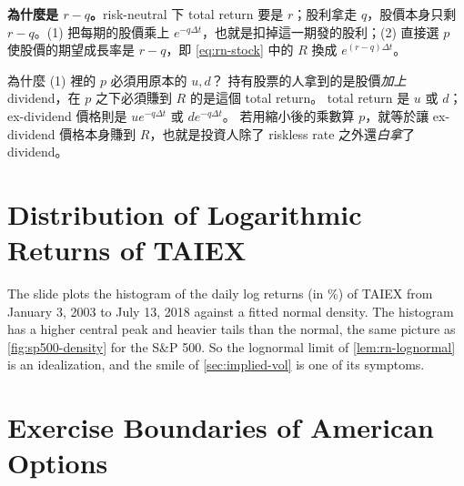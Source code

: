 \begin{remark}
	\textbf{為什麼是 $r-q$。}risk-neutral 下 total return 要是 $r$；股利拿走 $q$，股價本身只剩 $r-q$。(1) 把每期的股價乘上 $e^{-q\Delta t}$，也就是扣掉這一期發的股利；(2) 直接選 $p$ 使股價的期望成長率是 $r-q$，即 \eqref{eq:rn-stock} 中的 $R$ 換成 $e^{(r-q)\Delta t}$。
\end{remark}

\begin{note}
	為什麼 (1) 裡的 $p$ 必須用原本的 $u,d$？
	持有股票的人拿到的是股價\emph{加上} dividend，在 $p$ 之下必須賺到 $R$ 的是這個 total return。
	total return 是 $u$ 或 $d$；ex-dividend 價格則是 $ue^{-q\Delta t}$ 或 $de^{-q\Delta t}$。
	若用縮小後的乘數算 $p$，就等於讓 ex-dividend 價格本身賺到 $R$，也就是投資人除了 riskless rate 之外還\emph{白拿}了 dividend。
\end{note}
\suppend

\section{Distribution of Logarithmic Returns of TAIEX}


The slide plots the histogram of the daily log returns (in \%) of TAIEX from January 3, 2003 to July 13, 2018 against a fitted normal density.
\suppstart
The histogram has a higher central peak and heavier tails than the normal, the same picture as \autoref{fig:sp500-density} for the S\&P 500.
So the lognormal limit of \autoref{lem:rn-lognormal} is an idealization, and the smile of \autoref{sec:implied-vol} is one of its symptoms.

\suppend

\section{Exercise Boundaries of American Options}
\label{sec:exercise-boundary}

